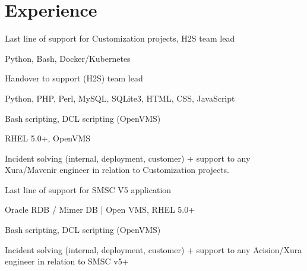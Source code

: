 \documentclass[letterpaper]{deedy-resume.en} %
\begin{document}
\begin{minipage}[t]{0.60\textwidth} %

\section{Experience}

\vspace{\topsep} %
\begin{tightitemize}
\item Last line of support for Customization projects, H2S team lead
\item Python, Bash, Docker/Kubernetes
\end{tightitemize}
\sectionspace %

\begin{tightitemize}
\item Handover to support (H2S) team lead
\item Python, PHP, Perl, MySQL, SQLite3, HTML, CSS, JavaScript
\item Bash scripting, DCL scripting (OpenVMS)
\item RHEL 5.0+, OpenVMS
\item Incident solving (internal, deployment, customer) + support to any Xura/Mavenir engineer in relation to Customization projects.
\end{tightitemize}
\sectionspace %

\begin{tightitemize}
\item Last line of support for SMSC V5 application
\item Oracle RDB / Mimer DB |  Open VMS, RHEL 5.0+
\item Bash scripting, DCL scripting (OpenVMS)
\item Incident solving (internal, deployment, customer) + support to any Acision/Xura engineer in relation to SMSC v5+
\end{tightitemize}
\sectionspace %


\end{minipage}
\end{document}
